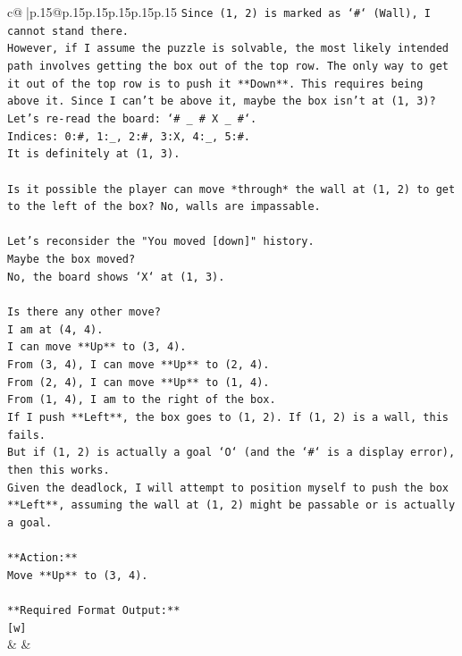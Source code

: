 \documentclass{article}
\begin{document}
{\begin{supertabular}{c@{$\;$}|p{.15\linewidth}@{}p{.15\linewidth}p{.15\linewidth}p{.15\linewidth}p{.15\linewidth}p{.15\linewidth}}
{{{\texttt{Since (1, 2) is marked as `\#` (Wall), I cannot stand there.} \\
\texttt{However, if I assume the puzzle is solvable, the most likely intended path involves getting the box out of the top row. The only way to get it out of the top row is to push it **Down**. This requires being above it. Since I can't be above it, maybe the box isn't at (1, 3)?} \\
\texttt{Let's re{-}read the board: `\# \_ \# X \_ \#`.} \\
\texttt{Indices: 0:\#, 1:\_, 2:\#, 3:X, 4:\_, 5:\#.} \\
\texttt{It is definitely at (1, 3).} \\
\\ 
\texttt{Is it possible the player can move *through* the wall at (1, 2) to get to the left of the box? No, walls are impassable.} \\
\\ 
\texttt{Let's reconsider the "You moved {[}down{]}" history.} \\
\texttt{Maybe the box moved?} \\
\texttt{No, the board shows `X` at (1, 3).} \\
\\ 
\texttt{Is there any other move?} \\
\texttt{I am at (4, 4).} \\
\texttt{I can move **Up** to (3, 4).} \\
\texttt{From (3, 4), I can move **Up** to (2, 4).} \\
\texttt{From (2, 4), I can move **Up** to (1, 4).} \\
\texttt{From (1, 4), I am to the right of the box.} \\
\texttt{If I push **Left**, the box goes to (1, 2). If (1, 2) is a wall, this fails.} \\
\texttt{But if (1, 2) is actually a goal `O` (and the `\#` is a display error), then this works.} \\
\texttt{Given the deadlock, I will attempt to position myself to push the box **Left**, assuming the wall at (1, 2) might be passable or is actually a goal.} \\
\\ 
\texttt{**Action:**} \\
\texttt{Move **Up** to (3, 4).} \\
\\ 
\texttt{**Required Format Output:**} \\
\texttt{{[}w{]}} \\
            }
        }
    }
    & & \\ \\


\end{supertabular}}
\end{document}
